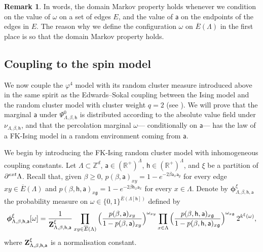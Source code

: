 \documentclass[11pt,a4paper]{article}
\theoremstyle{definition}
\newtheorem{remark}[theorem]{Remark}
\numberwithin{equation}{section}
\newcommand\fg{\mathfrak{g}}
\begin{document}
\begin{remark}
In words, the domain Markov property holds whenever we condition on the value of $\omega$ on a set of edges $E$, and the value of $\mathsf{a}$ on the endpoints of the edges in $E$. The reason why we define the configuration $\omega$ on $\overline E(\Lambda)$ in the first place is so that the domain Markov property holds.
\end{remark}


\subsection{Coupling to the spin model}

We now couple the $\varphi^4$ model with its random cluster measure introduced above in the same spirit as the Edwards--Sokal coupling between the Ising model and the random cluster model with cluster weight $q=2$ (see \cite[Chapter 1]{Grimmett2006RCM}). We will prove that the marginal $\mathsf{a}$ under $\Psi^0_{\Lambda,\beta,\mathsf{h}}$ is distributed according to the absolute value field under $\nu_{\Lambda,\beta,\mathsf{h}}$, and that the percolation marginal $\omega$--- conditionally on $\mathsf{a}$--- has the law of a FK-Ising model in a random environment coming from $\mathsf{a}$. 

We begin by introducing the FK-Ising random cluster model with inhomogeneous coupling constants. Let $\Lambda \subset \mathbb Z^d$, $\mathsf a \in (\mathbb R^+)^{\overline \Lambda}$, $
\mathsf h \in (\mathbb R^+)^\Lambda$, and $\xi$ be a partition of $\partial^{\rm ext}\Lambda$. Recall that, given $\beta \geq 0$, $p(\beta, \mathsf a)_{xy}=1-e^{-2\beta \mathsf a_x \mathsf a_y}$ for every edge $xy \in \overline E(\Lambda)$ and $p(\beta, \mathsf h, \mathsf a)_{x\mathfrak g}=1-e^{-2\beta \mathsf h_x \mathsf a_x}$ for every $x \in \Lambda$. Denote by $\boldsymbol \phi^\xi_{\Lambda,\beta,\mathsf h, \mathsf a}$ the probability measure on $\omega\in \{0,1\}^{\overline E(\Lambda[\mathsf h])}$ defined by
\begin{equation} \label{def: random weight rc}
\boldsymbol{\phi}^\xi_{\Lambda,\beta,\mathsf h, \mathsf a}[\omega]
=
\frac{1}{{\bf Z}^{\xi}_{\Lambda,\beta,\mathsf h, \mathsf a}}\prod_{xy \in \overline E(\Lambda)} \Big(\frac{p(\beta, \mathsf a)_{xy}}{1-p(\beta, \mathsf a)_{xy}}\Big)^{\omega_{xy}} \prod_{x \in \Lambda} \Big(\frac{p(\beta, \mathsf{h},\mathsf a)_{x\fg}}{1-p(\beta,\mathsf{h}, \mathsf a)_{x\fg}}\Big)^{\omega_{x\fg}} \, 2^{k^\xi(\omega)},
\end{equation} 
where ${\bf Z}^{\xi}_{\Lambda,\beta,\mathsf h, \mathsf a}$ is a normalisation constant.
\end{document}
